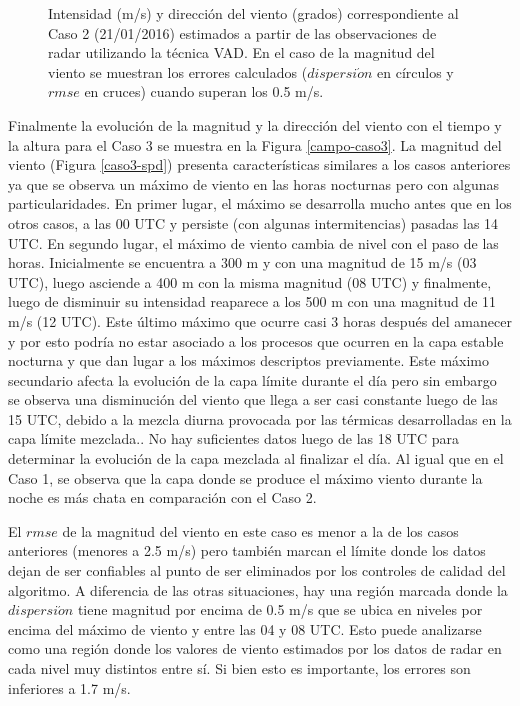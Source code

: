 \documentclass[12pt,spanish,oneside, a4paper]{book}
\begin{document}
\begin{figure}
\newline{}\caption{Intensidad (m/s) y dirección del viento (grados) correspondiente al Caso 2 (21/01/2016) estimados a partir de las observaciones de radar utilizando la técnica VAD. En el caso de la magnitud del viento se muestran los errores calculados ($dispersi\acute{o}n$ en círculos y $rmse$ en cruces) cuando superan los 0.5 m/s. \label{campo-caso2}}\label{fig:campo-caso2}
\end{figure}

Finalmente la evolución de la magnitud y la dirección del viento con el
tiempo y la altura para el Caso 3 se muestra en la Figura
\ref{campo-caso3}. La magnitud del viento (Figura \ref{caso3-spd})
presenta características similares a los casos anteriores ya que se
observa un máximo de viento en las horas nocturnas pero con algunas
particularidades. En primer lugar, el máximo se desarrolla mucho antes
que en los otros casos, a las 00 UTC y persiste (con algunas
intermitencias) pasadas las 14 UTC. En segundo lugar, el máximo de
viento cambia de nivel con el paso de las horas. Inicialmente se
encuentra a 300 m y con una magnitud de 15 m/s (03 UTC), luego asciende
a 400 m con la misma magnitud (08 UTC) y finalmente, luego de disminuir
su intensidad reaparece a los 500 m con una magnitud de 11 m/s (12 UTC).
Este último máximo que ocurre casi 3 horas después del amanecer y por
esto podría no estar asociado a los procesos que ocurren en la capa
estable nocturna y que dan lugar a los máximos descriptos previamente.
Este máximo secundario afecta la evolución de la capa límite durante el
día pero sin embargo se observa una disminución del viento que llega a
ser casi constante luego de las 15 UTC, debido a la mezcla diurna
provocada por las térmicas desarrolladas en la capa límite mezclada.. No
hay suficientes datos luego de las 18 UTC para determinar la evolución
de la capa mezclada al finalizar el día. Al igual que en el Caso 1, se
observa que la capa donde se produce el máximo viento durante la noche
es más chata en comparación con el Caso 2.

El \(rmse\) de la magnitud del viento en este caso es menor a la de los
casos anteriores (menores a 2.5 m/s) pero también marcan el límite donde
los datos dejan de ser confiables al punto de ser eliminados por los
controles de calidad del algoritmo. A diferencia de las otras
situaciones, hay una región marcada donde la \(dispersi\acute{o}n\)
tiene magnitud por encima de 0.5 m/s que se ubica en niveles por encima
del máximo de viento y entre las 04 y 08 UTC. Esto puede analizarse como
una región donde los valores de viento estimados por los datos de radar
en cada nivel muy distintos entre sí. Si bien esto es importante, los
errores son inferiores a 1.7 m/s.
\end{document}
